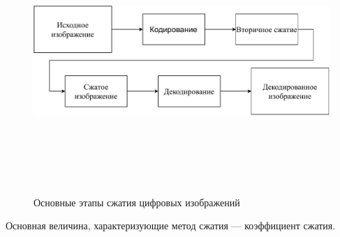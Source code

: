    

   

  \begin{figure}[h!]
    	\centering
    	\includegraphics[width=\textwidth,height=10cm,keepaspectratio]{Zip.pdf}
    	\caption{Основные этапы сжатия цифровых изображений} \label{fig:zip}
    \end{figure}
    
        
    
    
    \newpage
    
    Основная величина, характеризующие метод сжатия --- коэффициент сжатия.
    
